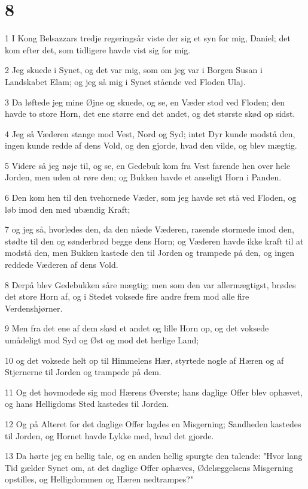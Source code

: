 \chapter{8}

\par 1 I Kong Belsazzars tredje regeringsår viste der sig et syn for mig, Daniel; det kom efter det, som tidligere havde vist sig for mig.
\par 2 Jeg skuede i Synet, og det var mig, som om jeg var i Borgen Susan i Landskabet Elam; og jeg så mig i Synet stående ved Floden Ulaj.
\par 3 Da løftede jeg mine Øjne og skuede, og se, en Væder stod ved Floden; den havde to store Horn, det ene større end det andet, og det største skød op sidst.
\par 4 Jeg så Væderen stange mod Vest, Nord og Syd; intet Dyr kunde modstå den, ingen kunde redde af dens Vold, og den gjorde, hvad den vilde, og blev mægtig.
\par 5 Videre så jeg nøje til, og se, en Gedebuk kom fra Vest farende hen over hele Jorden, men uden at røre den; og Bukken havde et anseligt Horn i Panden.
\par 6 Den kom hen til den tvehornede Væder, som jeg havde set stå ved Floden, og løb imod den med ubændig Kraft;
\par 7 og jeg så, hvorledes den, da den nåede Væderen, rasende stormede imod den, stødte til den og sønderbrød begge dens Horn; og Væderen havde ikke kraft til at modstå den, men Bukken kastede den til Jorden og trampede på den, og ingen reddede Væderen af dens Vold.
\par 8 Derpå blev Gedebukken såre mægtig; men som den var allermægtigst, brødes det store Horn af, og i Stedet voksede fire andre frem mod alle fire Verdenshjørner.
\par 9 Men fra det ene af dem skød et andet og lille Horn op, og det voksede umådeligt mod Syd og Øst og mod det herlige Land;
\par 10 og det voksede helt op til Himmelens Hær, styrtede nogle af Hæren og af Stjernerne til Jorden og trampede på dem.
\par 11 Og det hovmodede sig mod Hærens Øverste; hans daglige Offer blev ophævet, og hans Helligdoms Sted kastedes til Jorden.
\par 12 Og på Alteret for det daglige Offer lagdes en Misgerning; Sandheden kastedes til Jorden, og Hornet havde Lykke med, hvad det gjorde.
\par 13 Da hørte jeg en hellig tale, og en anden hellig spurgte den talende: "Hvor lang Tid gælder Synet om, at det daglige Offer ophæves, Ødelæggelsens Misgerning opstilles, og Helligdommen og Hæren nedtrampes?"
